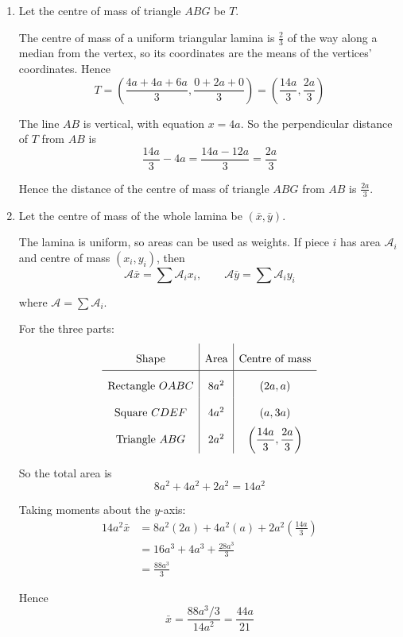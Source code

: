 \documentclass[leqno]{article}
\begin{document}
\begin{enumerate}[
  label=\textbf{\arabic*.},
  leftmargin=*,
  topsep=0pt,
  partopsep=0pt,
  parsep=0pt
]
\vspace*{10pt}

\begin{djsSolution}
\begin{enumerate}[label=\textbf{(\alph*)}, start=1]
  \item Let the centre of mass of triangle $ABG$ be $T$.

The centre of mass of a uniform triangular lamina is $\frac23$ of the way along a median from the vertex, so its coordinates are the means of the vertices' coordinates. Hence
\[
T=\left(\frac{4a+4a+6a}{3},\frac{0+2a+0}{3}\right)=\left(\frac{14a}{3},\frac{2a}{3}\right)
\]

The line $AB$ is vertical, with equation $x=4a$.
So the perpendicular distance of $T$ from $AB$ is
\[
\frac{14a}{3}-4a=\frac{14a-12a}{3}=\frac{2a}{3}
\]

Hence the distance of the centre of mass of triangle $ABG$ from $AB$ is $\frac{2a}{3}$.

  \item Let the centre of mass of the whole lamina be $(\bar{x},\bar{y})$.

The lamina is uniform, so areas can be used as weights. If piece $i$ has area $\mathcal{A}_i$ and centre of mass $(x_i,y_i)$, then
\[
\mathcal{A}\bar{x}=\sum\mathcal{A}_ix_i,\qquad\mathcal{A}\bar{y}=\sum\mathcal{A}_iy_i
\]

where $\mathcal{A}=\sum\mathcal{A}_i$.

For the three parts:
\[
\begingroup
\renewcommand{\arraystretch}{2.0}
\begin{array}{c|c|c}
\text{Shape} & \text{Area} & \text{Centre of mass} \\
\hline
\text{Rectangle }OABC & 8a^2 & (2a,a) \\
\text{Square }CDEF & 4a^2 & (a,3a) \\
\text{Triangle }ABG & 2a^2 & \left(\dfrac{14a}{3},\dfrac{2a}{3}\right)
\end{array}
\endgroup
\]

So the total area is
\[
8a^2+4a^2+2a^2=14a^2
\]

Taking moments about the $y$-axis:
\begin{align*}
14a^2\bar{x} &= 8a^2(2a)+4a^2(a)+2a^2\left(\frac{14a}{3}\right) \\
&= 16a^3+4a^3+\frac{28a^3}{3} \\
&= \frac{88a^3}{3}
\end{align*}

Hence
\[
\bar{x}=\frac{88a^3/3}{14a^2}=\frac{44a}{21}
\]


\end{enumerate}
\end{djsSolution}
\end{enumerate}
\end{document}
